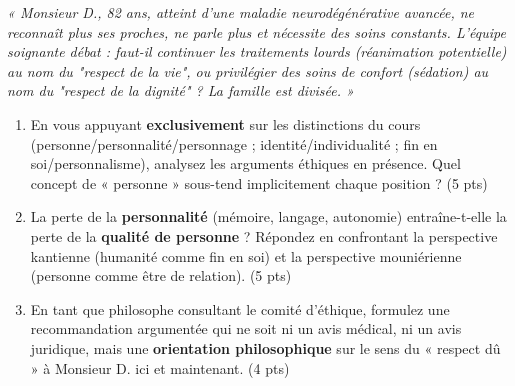 \documentclass[11pt]{article}
\begin{document}
\begin{exercice}
\textit{« Monsieur D., 82 ans, atteint d'une maladie neurodégénérative avancée, ne reconnaît plus ses proches, ne parle plus et nécessite des soins constants. L'équipe soignante débat : faut-il continuer les traitements lourds (réanimation potentielle) au nom du "respect de la vie", ou privilégier des soins de confort (sédation) au nom du "respect de la dignité" ? La famille est divisée. »}
\begin{enumerate}
    \item En vous appuyant \textbf{exclusivement} sur les distinctions du cours (personne/personnalité/personnage ; identité/individualité ; fin en soi/personnalisme), analysez les arguments éthiques en présence. Quel concept de « personne » sous-tend implicitement chaque position ? (5 pts)
    \item La perte de la \textbf{personnalité} (mémoire, langage, autonomie) entraîne-t-elle la perte de la \textbf{qualité de personne} ? Répondez en confrontant la perspective kantienne (humanité comme fin en soi) et la perspective mouniérienne (personne comme être de relation). (5 pts)
    \item En tant que philosophe consultant le comité d'éthique, formulez une recommandation argumentée qui ne soit ni un avis médical, ni un avis juridique, mais une \textbf{orientation philosophique} sur le sens du « respect dû » à Monsieur D. ici et maintenant. (4 pts)
\end{enumerate}
\end{exercice}
\end{document}
